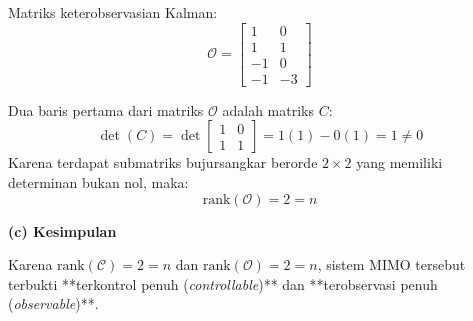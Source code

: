 \documentclass[11pt,a4paper]{article}
\begin{document}
Matriks keterobservasian Kalman:
$$\mathcal{O} = \begin{bmatrix} 1 & 0 \\ 1 & 1 \\ -1 & 0 \\ -1 & -3 \end{bmatrix}$$

Dua baris pertama dari matriks $\mathcal{O}$ adalah matriks $C$:
$$\det(C) = \det\begin{bmatrix} 1 & 0 \\ 1 & 1 \end{bmatrix} = 1(1) - 0(1) = 1 \ne 0$$
Karena terdapat submatriks bujursangkar berorde $2 \times 2$ yang memiliki determinan bukan nol, maka:
$$\text{rank}(\mathcal{O}) = 2 = n$$

\textbf{(c) Kesimpulan}

Karena $\text{rank}(\mathcal{C}) = 2 = n$ dan $\text{rank}(\mathcal{O}) = 2 = n$, sistem MIMO tersebut terbukti **terkontrol penuh (\textit{controllable})** dan **terobservasi penuh (\textit{observable})**.
\end{document}
